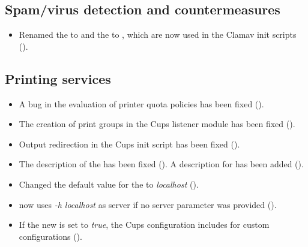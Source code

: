 
\subsection{Spam/virus detection and countermeasures}
\begin{itemize}
\item Renamed the  to
   and the
   to
  , which are now used in the
  Clamav init scripts ().
\end{itemize}

\subsection{Printing services}
\begin{itemize}
\item A bug in the evaluation of printer quota policies has been fixed ().
\item The creation of print groups in the Cups listener module has been fixed ().
\item Output redirection in the Cups init script has been fixed ().
\item The description of the  has
  been fixed (). A description for
   has been added ().
\item Changed the default value for the  to
  \emph{localhost} ().
\item {} now uses \emph{-h localhost} as server if no
  server parameter was provided ().
\item If the new  is set to \emph{true}, the
Cups configuration includes  for
custom configurations ().
\end{itemize}

